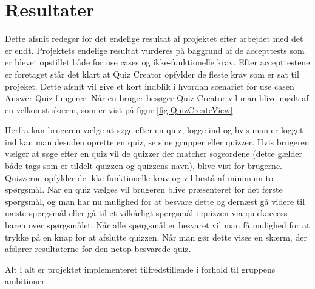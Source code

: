 \section{Resultater}
Dette afsnit redegør for det endelige resultat af projektet efter arbejdet med det er endt. Projektets endelige resultat vurderes på baggrund af de accepttests som er blevet opstillet både for use cases og ikke-funktionelle krav. Efter accepttestene er foretaget står det klart at Quiz Creator opfylder de fleste krav som er sat til projeket. Dette afsnit vil give et kort indblik i hvordan scenariet for use casen Answer Quiz fungerer. Når en bruger besøger Quiz Creator vil man blive mødt af en velkomst skærm, som er vist på figur \ref{fig:QuizCreateView}


Herfra kan brugeren vælge at søge efter en quiz, logge ind og hvis man er logget ind kan man desuden oprette en quiz, se sine grupper eller quizzer. Hvis brugeren vælger at søge efter en quiz vil de quizzer der matcher søgeordene (dette gælder både tags som er tildelt quizzen og quizzens navn), blive vist for brugerne. Quizzerne opfylder de ikke-funktionelle krav og vil bestå af minimum to spørgsmål. Når en quiz vælges vil brugeren blive præsenteret for det første spørgsmål, og man har nu mulighed for at besvare dette og dernæst gå videre til næste spørgsmål eller gå til et vilkårligt spørgsmål i quizzen via quickaccess baren over spørgsmålet. Når alle spørgsmål er besvaret vil man få mulighed for at trykke på en knap for at afslutte quizzen. Når man gør dette vises en skærm, der afslører resultaterne for den netop besvarede quiz.

Alt i alt er projektet implementeret tilfredstillende i forhold til gruppens ambitioner. 

